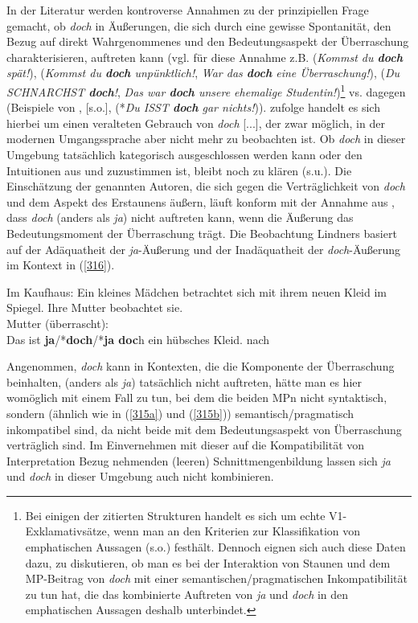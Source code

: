 In der Literatur werden kontroverse Annahmen zu der prinzipiellen Frage gemacht, ob \textit{doch} in Äußerungen, die sich durch eine gewisse Spontanität, den Bezug auf direkt Wahrgenommenes und den Bedeutungsas\-pekt der Überraschung charakterisieren, auftreten kann (vgl. für diese Annahme z.B. \citealt[26]{Weydt1969} (\textit{Kommst du \textbf{doch} spät!}), \citealt[37]{Helbig1977} (\textit{Kommst du \textbf{doch} unpünktlich!}, \textit{War das \textbf{doch} eine Überraschung!}), \citealt[116]{Helbig1990} (\textit{Du SCHNARCHST \textbf{doch}!}, \textit{Das war \textbf{doch} unsere ehemalige Studentin!})\footnote{Bei einigen der zitierten Strukturen handelt es sich um echte V1-Exklamativsätze, wenn man an den Kriterien zur Klassifikation von emphatischen Aussagen (s.o.) festhält. Dennoch eignen sich auch diese Daten dazu, zu diskutieren, ob man es bei der Interaktion von Staunen und dem MP-Beitrag von \textit{doch} mit einer semantischen/pragmatischen Inkompatibilität zu tun hat, die das kombinierte Auftreten von \textit{ja} und \textit{doch} in den emphatischen Aussagen deshalb unterbindet.} vs. dagegen \citealt[141]{Hentschel1986} (Beispiele von \citealt[26]{Weydt1969}, \citealt[37]{Helbig1977} [s.o.], \citealt[216]{Rinas2006} (*\textit{Du ISST \textbf{doch} gar nichts!})). \citet[141]{Hentschel1986} zufolge handelt es sich hierbei \glqq um einen veralteten Gebrauch von \textit{doch} [...], der zwar möglich, in der modernen Umgangssprache aber nicht mehr zu beobachten ist\grqq{}. Ob \textit{doch} in dieser Umgebung tatsächlich kate\-gorisch ausgeschlossen werden kann oder den Intuitionen aus \citet{Weydt1969} und \citet{Helbig1977, Helbig1990} zuzustimmen ist, bleibt noch zu klären (s.u.). Die Einschätzung der genannten Autoren, die sich gegen die Verträglichkeit von \textit{doch} und dem Aspekt des Erstaunens äußern, läuft konform mit der Annahme aus \citet[193]{Lindner1991}, dass \textit{doch} (anders als \textit{ja}) nicht auftreten kann, wenn die Äußerung das Bedeutungsmoment der Überraschung trägt. Die Beobachtung Lindners basiert auf der Adäquatheit der \textit{ja}-Äußerung und der Inadäquatheit der \textit{doch}-Äußerung im Kontext in (\ref{316}).  
	         
\begin{exe}
	\ex\label{316} 
	Im Kaufhaus: Ein kleines Mädchen betrachtet sich mit ihrem neuen Kleid im Spiegel. Ihre Mutter beobachtet sie.\\
	Mutter (überrascht):\\
	Das ist \textbf{ja}/*\textbf{doch}/*\textbf{ja doc}h ein hübsches Kleid. 
	\hfill\hbox {nach \citet[193]{Lindner1991}}
\end{exe}							
Angenommen, \textit{doch} kann in Kontexten, die die Komponente der Überraschung beinhalten, (anders als \textit{ja}) tatsächlich nicht auftreten, hätte man es hier wo\-möglich mit einem Fall zu tun, bei dem die beiden MPn nicht syntaktisch, sondern (ähnlich wie in (\ref{315a}) und (\ref{315b})) semantisch/pragmatisch inkompatibel sind, da nicht beide mit dem Bedeutungsas\-pekt von Überraschung verträglich sind. Im Einvernehmen mit dieser auf die Kompatibilität von Interpretation Bezug nehmenden (leeren) Schnittmengenbildung lassen sich \textit{ja} und \textit{doch} in dieser Umgebung auch nicht kombinieren.


